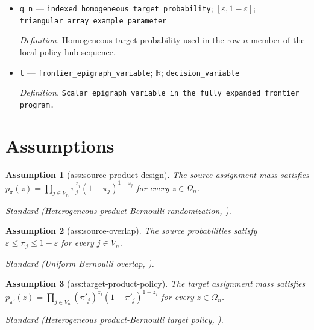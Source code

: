 \documentclass{article}
\newtheorem{assumption}{Assumption}
\begin{document}
\begin{itemize}
  \par\smallskip\noindent\emph{Definition.} Homogeneous source probability used in the row-\(n\) member of the local-policy hub sequence.
  \item \texttt{q\_\allowbreak{}n} --- \texttt{indexed\_\allowbreak{}homogeneous\_\allowbreak{}target\_\allowbreak{}probability}; \([\varepsilon,1-\varepsilon]\); \texttt{triangular\_\allowbreak{}array\_\allowbreak{}example\_\allowbreak{}parameter}
  \par\smallskip\noindent\emph{Definition.} Homogeneous target probability used in the row-\(n\) member of the local-policy hub sequence.
  \item \texttt{t} --- \texttt{frontier\_\allowbreak{}epigraph\_\allowbreak{}variable}; \(\mathbb R\); \texttt{decision\_\allowbreak{}variable}
  \par\smallskip\noindent\emph{Definition.} \texttt{Scalar epigraph variable in the fully expanded frontier program.}
\end{itemize}

\section{Assumptions}

\begin{assumption}[ass:source-product-design]\label{ass:source-product-design}
The source assignment mass satisfies \(p_{\pi}(z)=\prod_{j\in V_n}\pi_j^{z_j}(1-\pi_j)^{1-z_j}\) for every \(z\in\Omega_n\).
\par\smallskip\noindent\emph{Standard} (Heterogeneous product-Bernoulli randomization, \cite{LoombaEckles2026OffPolicy}).
\end{assumption}

\begin{assumption}[ass:source-overlap]\label{ass:source-overlap}
The source probabilities satisfy \(\varepsilon\le\pi_j\le1-\varepsilon\) for every \(j\in V_n\).
\par\smallskip\noindent\emph{Standard} (Uniform Bernoulli overlap, \cite{LoombaEckles2026OffPolicy}).
\end{assumption}

\begin{assumption}[ass:target-product-policy]\label{ass:target-product-policy}
The target assignment mass satisfies \(p_{\pi'}(z)=\prod_{j\in V_n}(\pi'_j)^{z_j}(1-\pi'_j)^{1-z_j}\) for every \(z\in\Omega_n\).
\par\smallskip\noindent\emph{Standard} (Heterogeneous product-Bernoulli target policy, \cite{LoombaEckles2026OffPolicy}).
\end{assumption}
\end{document}
